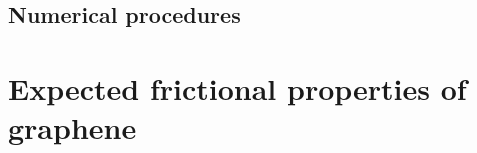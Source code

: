 











\subsection{Numerical procedures}



\section{Expected frictional properties of graphene}\label{sec:expected_prop}



